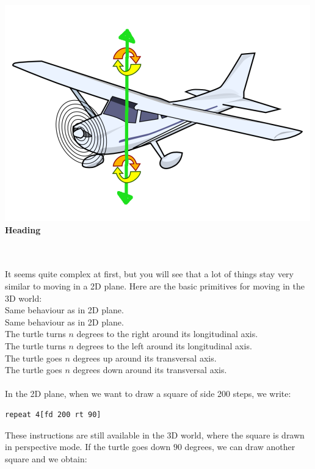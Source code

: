 \begin{minipage}{5.5cm}
\begin{center}
\includegraphics*[scale=0.3]{pics/plane-heading.png}
\textbf{Heading}
\end{center}
\end{minipage}\\ \\
It seems quite complex at first, but you will see that a lot of things stay very similar to moving in a 2D plane. Here are the basic primitives for moving in the 3D world:\\
Same behaviour as in 2D plane.\\
Same behaviour as in 2D plane.\\
The turtle turns $n$ degrees to the right around its longitudinal axis.\\
The turtle turns $n$ degrees to the left around its longitudinal axis. \\
The turtle goes $n$ degrees up around its transversal axis.\\
The turtle goes $n$ degrees down around its transversal axis.\\ \\
In the 2D plane, when we want to draw a square of side 200 steps, we write:
\begin{verbatim}
repeat 4[fd 200 rt 90] 
\end{verbatim}
These instructions are still available in the 3D world, where the square is drawn in perspective mode. If the turtle goes down $90$ degrees, we can draw another square and we obtain: \\
